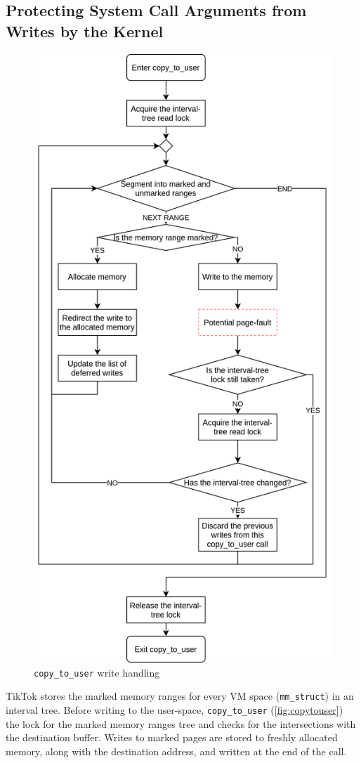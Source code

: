\documentclass[conference]{IEEEtran}
\newcommand{\sysname}{TikTok}
\begin{document}
\subsection{Protecting System Call Arguments from Writes by the Kernel}
\label{subsec:kernelland}
\begin{figure}[]
  \centering
  \includegraphics[width = 0.8\linewidth]{img/copy_to_user.png}
  \caption{\texttt{copy\_to\_user} write handling}
  \label{fig:copytouser}
\end{figure}

\sysname{} stores the marked memory ranges for every VM space
(\texttt{mm\_struct}) in an interval tree. Before writing to the user-space,
\texttt{copy\_to\_user} (\autoref{fig:copytouser}) the lock for the marked memory
ranges tree and checks for the intersections with the destination buffer. Writes
to marked pages are stored to freshly allocated memory, along with the
destination address, and written at the end of the call.
\end{document}
